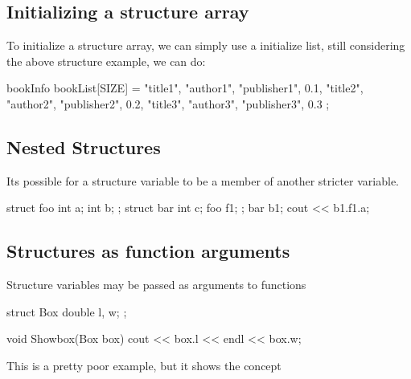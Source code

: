 \documentclass{report}
\begin{document}
	\bigbreak \noindent 
	\subsection{Initializing a structure array}
	\bigbreak \noindent 
	To initialize a structure array, we can simply use a initialize list, still considering the above structure example, we can do:
	\bigbreak \noindent 
	
	\begin{cppcode}
bookInfo bookList[SIZE] = {
                            {"title1", "author1", "publisher1", 0.1},
                            {"title2", "author2", "publisher2", 0.2},
                            {"title3", "author3", "publisher3", 0.3}
                            };
	\end{cppcode}
	
	\bigbreak \noindent 

	\pagebreak
	\subsection{Nested Structures}
	\bigbreak \noindent 
	Its possible for a structure variable to be a member of another stricter variable.
	\bigbreak \noindent 
	
	\begin{cppcode}
struct foo {
    int a;
    int b;
};
struct bar {
    int c;
    foo f1;
};
bar b1;
cout << b1.f1.a;
	\end{cppcode}
	

	\bigbreak \noindent 
	\subsection{Structures as function arguments}
	\bigbreak \noindent 
	\begin{concept}
	   Structure variables may be passed as arguments to functions 
	\end{concept}
	\bigbreak \noindent 
	
	\begin{cppcode}
struct Box {
    double l, w;
};

void Showbox(Box box) {
    cout << box.l << endl << box.w;
}
	\end{cppcode}
	
	
	\bigbreak \noindent 
	\begin{notebox}
			This is a pretty poor example, but it shows the concept
	\end{notebox}
	\bigbreak \noindent 

	\pagebreak
\end{document}
